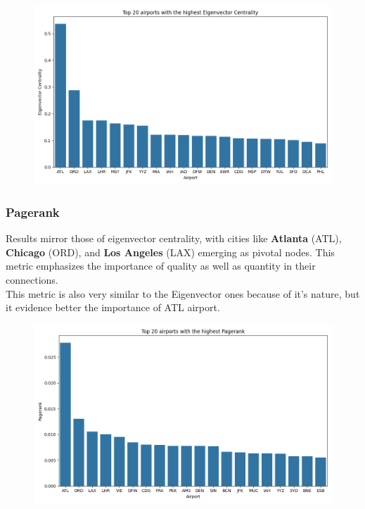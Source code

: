 \documentclass[12pt]{article}
\begin{document}
    \begin{figure}[H]
        \centering
        \includegraphics[width=0.8\linewidth]{img/eigenvector_centrality}
    \end{figure}

    \subsubsection{Pagerank}
    Results mirror those of eigenvector centrality, with cities like \textbf{Atlanta} (ATL), \textbf{Chicago} (ORD), and \textbf{Los Angeles} (LAX) emerging as pivotal nodes. This metric emphasizes the importance of quality as well as quantity in their connections.\\
    This metric is also very similar to the Eigenvector ones because of it's nature, but it evidence better the importance of ATL airport.
    
    \begin{figure}[H]
        \centering
        \includegraphics[width=0.8\linewidth]{img/pagerank}
    \end{figure}
\end{document}
